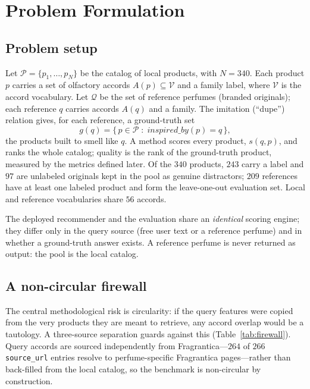 \documentclass[conference]{IEEEtran}
\begin{document}
\section{Problem Formulation}\label{sec:problem}

\subsection{Problem setup}
Let $\mathcal{P}=\{p_1,\dots,p_N\}$ be the catalog of local products, with $N=340$. Each
product $p$ carries a set of olfactory accords $A(p)\subseteq\mathcal{V}$ and a family
label, where $\mathcal{V}$ is the accord vocabulary. Let $\mathcal{Q}$ be the set of
reference perfumes (branded originals); each reference $q$ carries accords $A(q)$ and a
family. The imitation (``dupe'') relation gives, for each reference, a ground-truth set
\begin{equation}
g(q)=\{\,p\in\mathcal{P}\;:\;\textit{inspired\_by}(p)=q\,\}, \label{eq:gold}
\end{equation}
the products built to smell like $q$. A method scores every product, $s(q,p)$, and ranks
the whole catalog; quality is the rank of the ground-truth product, measured by the metrics
defined later. Of the $340$ products, $243$ carry a label and $97$ are unlabeled originals
kept in the pool as genuine distractors; $209$ references have at least one labeled product
and form the leave-one-out evaluation set. Local and reference vocabularies share $56$
accords.

The deployed recommender and the evaluation share an \emph{identical} scoring engine; they
differ only in the query source (free user text or a reference perfume) and in whether a
ground-truth answer exists. A reference perfume is never returned as output: the pool is the
local catalog.

\subsection{A non-circular firewall}
The central methodological risk is circularity: if the query features were copied from the
very products they are meant to retrieve, any accord overlap would be a tautology. A
three-source separation guards against this (Table~\ref{tab:firewall}). Query accords are
sourced independently from Fragrantica---$264$ of $266$ \texttt{source\_url} entries resolve
to perfume-specific Fragrantica pages---rather than back-filled from the local catalog, so
the benchmark is non-circular by construction.
\end{document}
